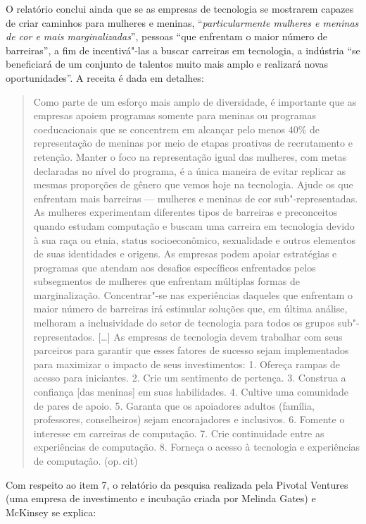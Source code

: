 O relatório conclui ainda que se as empresas de tecnologia se mostrarem
capazes de criar caminhos para mulheres e meninas,
``\emph{particularmente mulheres e meninas de cor e mais
marginalizadas}'', pessoas ``que enfrentam o maior número de
barreiras'', a fim de incentivá"-las a buscar carreiras em tecnologia, a
indústria ``se beneficiará de um conjunto de talentos muito mais amplo e
realizará novas oportunidades''. A receita é dada em detalhes:

\begin{quote}
Como parte de um esforço mais amplo de diversidade, é importante que as
empresas apoiem programas somente para meninas ou programas
coeducacionais que se concentrem em alcançar pelo menos 40\% de
representação de meninas por meio de etapas proativas de recrutamento e
retenção. Manter o foco na representação igual das mulheres, com metas
declaradas no nível do programa, é a única maneira de evitar replicar as
mesmas proporções de gênero que vemos hoje na tecnologia. Ajude os que
enfrentam mais barreiras --- mulheres e meninas de cor sub"-representadas.
As mulheres experimentam diferentes tipos de barreiras e preconceitos
quando estudam computação e buscam uma carreira em tecnologia devido à
sua raça ou etnia, status socioeconômico, sexualidade e outros elementos
de suas identidades e origens. As empresas podem apoiar estratégias e
programas que atendam aos desafios específicos enfrentados pelos
subsegmentos de mulheres que enfrentam múltiplas formas de
marginalização. Concentrar"-se nas experiências daqueles que enfrentam o
maior número de barreiras irá estimular soluções que, em última análise,
melhoram a inclusividade do setor de tecnologia para todos os grupos
sub"-representados. {[}\ldots{}{]} As empresas de tecnologia devem trabalhar
com seus parceiros para garantir que esses fatores de sucesso sejam
implementados para maximizar o impacto de seus investimentos: 1. Ofereça
rampas de acesso para iniciantes. 2. Crie um sentimento de pertença. 3.
Construa a confiança {[}das meninas{]} em suas habilidades. 4. Cultive
uma comunidade de pares de apoio. 5. Garanta que os apoiadores adultos
(família, professores, conselheiros) sejam encorajadores e inclusivos.
6. Fomente o interesse em carreiras de computação. 7. Crie continuidade
entre as experiências de computação. 8. Forneça o acesso à tecnologia e
experiências de computação. (op.\,cit)
\end{quote}

Com respeito ao item 7, o relatório da pesquisa realizada pela Pivotal
Ventures (uma empresa de investimento e incubação criada por Melinda
Gates) e McKinsey se explica:


